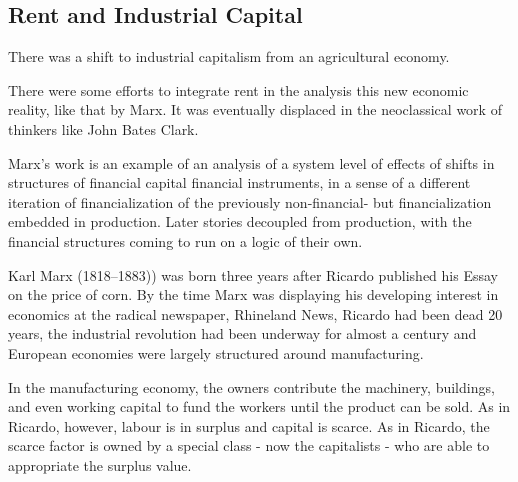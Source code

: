 \subsection{Rent and Industrial Capital}

There was a shift to industrial capitalism from an agricultural economy.

There were some efforts to integrate rent in the analysis  this new economic reality, like that by Marx.
It was eventually displaced in the neoclassical work of thinkers like John Bates Clark.

Marx's work is an example of an analysis of a system level of effects of shifts in structures of financial capital financial instruments, in a sense of a different iteration of financialization of the previously non-financial- but financialization embedded in production. Later stories decoupled from production, with the financial structures coming to run on a logic of their own.

Karl Marx (1818--1883)) was born three years after Ricardo published his Essay on the price of corn. 
By the time Marx was displaying  his developing interest in economics  at the radical newspaper, Rhineland News, Ricardo had been dead 20 years, the industrial revolution had been underway for almost a century and European economies were largely structured around manufacturing. 

 In the manufacturing economy, the owners contribute the machinery, buildings, and even working capital to fund the workers until the product can be sold. %
As in Ricardo, however, labour is in surplus and capital is scarce. As in Ricardo, the scarce factor is owned by a special class - now the capitalists - who are able to appropriate the surplus value. %


